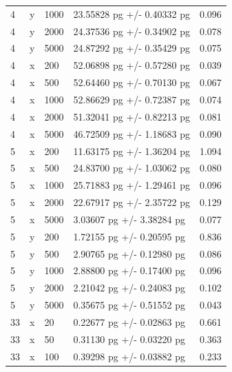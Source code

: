 \documentclass[12pt]{article}
\begin{document}
\begin{longtable}{lllll}
4         & y        & 1000 & 23.55828 pg +/- 0.40332 pg   & 0.096                  \\
4         & y        & 2000 & 24.37536 pg +/- 0.34902 pg   & 0.078                  \\
4         & y        & 5000 & 24.87292 pg +/- 0.35429 pg   & 0.075                  \\
4         & x        & 200  & 52.06898 pg +/- 0.57280 pg   & 0.039                  \\
4         & x        & 500  & 52.64460 pg +/- 0.70130 pg   & 0.067                  \\
4         & x        & 1000 & 52.86629 pg +/- 0.72387 pg   & 0.074                  \\
4         & x        & 2000 & 51.32041 pg +/- 0.82213 pg   & 0.081                  \\
4         & x        & 5000 & 46.72509 pg +/- 1.18683 pg   & 0.090                  \\
5         & x        & 200  & 11.63175 pg +/- 1.36204 pg   & 1.094                  \\
5         & x        & 500  & 24.83700 pg +/- 1.03062 pg   & 0.080                  \\
5         & x        & 1000 & 25.71883 pg +/- 1.29461 pg   & 0.096                  \\
5         & x        & 2000 & 22.67917 pg +/- 2.35722 pg   & 0.129                  \\
5         & x        & 5000 & 3.03607 pg +/- 3.38284 pg    & 0.077                  \\
5         & y        & 200  & 1.72155 pg +/- 0.20595 pg    & 0.836                  \\
5         & y        & 500  & 2.90765 pg +/- 0.12980 pg    & 0.086                  \\
5         & y        & 1000 & 2.88800 pg +/- 0.17400 pg    & 0.096                  \\
5         & y        & 2000 & 2.21042 pg +/- 0.24083 pg    & 0.102                  \\
5         & y        & 5000 & 0.35675 pg +/- 0.51552 pg    & 0.043                  \\
33        & x        & 20   & 0.22677 pg +/- 0.02863 pg    & 0.661                  \\
33        & x        & 50   & 0.31130 pg +/- 0.03220 pg    & 0.363                  \\
33        & x        & 100  & 0.39298 pg +/- 0.03882 pg    & 0.233                  \\

\end{longtable}
\end{document}
